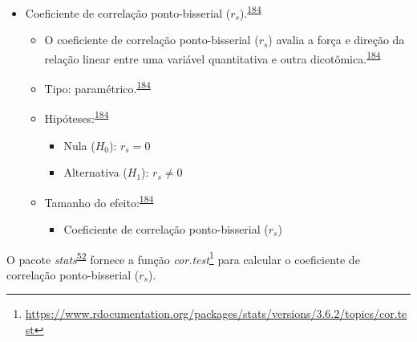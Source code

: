 \documentclass[
  a4paper,
]{book}
\providecommand{\tightlist}{%
  \setlength{\itemsep}{0pt}\setlength{\parskip}{0pt}}
\renewcommand{\href}[2]{#2\footnote{\url{#1}}}
\newenvironment{infobox}[1]
  {
  \begin{itemize}
  \renewcommand{\labelitemi}{
    \raisebox{-.7\height}[0pt][0pt]{
      {\setkeys{Gin}{width=3em,keepaspectratio}
        \texttt{[image: \#1]}}
    }
  }
  \setlength{\fboxsep}{1em}
  \begin{blackbox}
  \item
  }
  {
  \end{blackbox}
  \end{itemize}
  }
\begin{document}
\begin{itemize}
\item
  Coeficiente de correlação ponto-bisserial (\(r_{s}\)).\textsuperscript{\protect\hyperlink{ref-khamis2008}{184}}

  \begin{itemize}
  \item
    O coeficiente de correlação ponto-bisserial (\(r_{s}\)) avalia a força e direção da relação linear entre uma variável quantitativa e outra dicotômica.\textsuperscript{\protect\hyperlink{ref-khamis2008}{184}}
  \item
    Tipo: paramétrico.\textsuperscript{\protect\hyperlink{ref-khamis2008}{184}}
  \item
    Hipóteses:\textsuperscript{\protect\hyperlink{ref-khamis2008}{184}}

    \begin{itemize}
    \item
      Nula (\(H_{0}\)): \(r_{s}=0\)
    \item
      Alternativa (\(H_{1}\)): \(r_{s}≠0\)
    \end{itemize}
  \item
    Tamanho do efeito:\textsuperscript{\protect\hyperlink{ref-khamis2008}{184}}

    \begin{itemize}
    \tightlist
    \item
      Coeficiente de correlação ponto-bisserial (\(r_{s}\))
    \end{itemize}
  \end{itemize}
\end{itemize}

\begin{infobox}{images/Rlogo}
O pacote \emph{stats}\textsuperscript{\protect\hyperlink{ref-stats-2}{52}} fornece a função \href{https://www.rdocumentation.org/packages/stats/versions/3.6.2/topics/cor.test}{\emph{cor.test}} para calcular o coeficiente de correlação ponto-bisserial (\(r_{s}\)).

\end{infobox}
\end{document}
